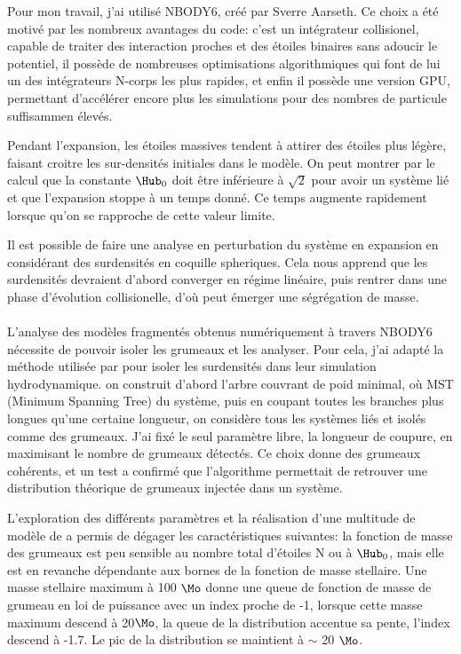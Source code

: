 Pour mon travail, j'ai utilisé NBODY6, créé par Sverre Aarseth. Ce choix a été motivé par les nombreux avantages du code: c'est un intégrateur collisionel, capable de traiter des interaction proches et des étoiles binaires sans adoucir le potentiel, il possède de nombreuses optimisations algorithmiques qui font de lui un des intégrateurs N-corps les plus rapides, et enfin il possède une version GPU, permettant d'accélérer encore plus les simulations pour des nombres de particule suffisammen élevés.

Pendant l'expansion, les étoiles massives tendent à attirer des étoiles plus légère, faisant croitre les sur-densités initiales dans le modèle. On peut montrer par le calcul que la constante $\Hub_0$ doit être inférieure à $\sqrt{2}$ pour avoir un système lié et que l'expansion stoppe à un temps donné. Ce temps augmente rapidement lorsque qu'on se rapproche de cette valeur limite.

Il est possible de faire une analyse en perturbation du système en expansion en considérant des surdensités en coquille spheriques. Cela nous apprend que les surdensités devraient d'abord converger en régime linéaire, puis rentrer dans une phase d'évolution collisionelle, d'où peut émerger une ségrégation de masse.

\paragraph*{}
L'analyse des modèles fragmentés obtenus numériquement à travers NBODY6 nécessite de pouvoir isoler les grumeaux et les analyser. Pour cela, j'ai adapté la méthode utilisée par \cite{Maschberger2010} pour isoler les surdensités dans leur simulation hydrodynamique. on construit d'abord l'arbre couvrant de poid minimal, où MST (Minimum Spanning Tree) du système, puis en coupant toutes les branches plus longues qu'une certaine longueur, on considère tous les systèmes liés et isolés comme des grumeaux. J'ai fixé le seul paramètre libre, la longueur de coupure, en maximisant le nombre de grumeaux détectés. Ce choix donne des grumeaux cohérents, et un test a confirmé que l'algorithme permettait de retrouver une distribution théorique de grumeaux injectée dans un système.

L'exploration des différents paramètres et la réalisation d'une multitude de modèle de \HubLem a permis de dégager les caractéristiques suivantes: la fonction de masse des grumeaux est peu sensible au nombre total d'étoiles N ou à $\Hub_0$, mais elle est en revanche dépendante aux bornes de la fonction de masse stellaire. Une masse stellaire maximum à 100 $\Mo$ donne une queue de fonction de masse de grumeau en loi de puissance avec un index proche de -1, lorsque cette masse maximum descend à 20$\Mo$, la queue de la distribution accentue sa pente, l'index descend à -1.7. Le pic de la distribution se maintient à $\sim$ 20 $\Mo$.

